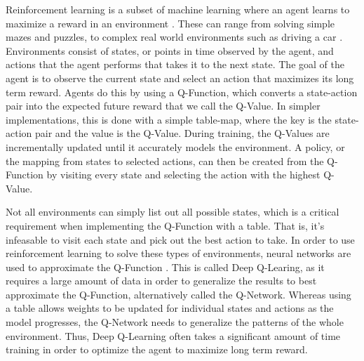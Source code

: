 \documentclass[12pt]{article}
\begin{document}
Reinforcement learning is a subset of machine learning where an agent learns to maximize a reward in an environment \cite{article_reinforcement_learning_survey}.
These can range from solving simple mazes and puzzles, to complex real world environments such as driving a car \cite{article_deep_learning_hybrid_quantum}.
Environments consist of states, or points in time observed by the agent, and actions that the agent performs that takes it to the next state.
The goal of the agent is to observe the current state and select an action that maximizes its long term reward.
Agents do this by using a Q-Function, which converts a state-action pair into the expected future reward that we call the Q-Value.
In simpler implementations, this is done with a simple table-map, where the key is the state-action pair and the value is the Q-Value.
During training, the Q-Values are incrementally updated until it accurately models the environment.
A policy, or the mapping from states to selected actions, can then be created from the Q-Function by visiting every state and selecting the action with the highest Q-Value.

Not all environments can simply list out all possible states, which is a critical requirement when implementing the Q-Function with a table.
That is, it's infeasable to visit each state and pick out the best action to take.
In order to use reinforcement learning to solve these types of environments, neural networks are used to approximate the Q-Function \cite{article_reinforcement_learning_for_robots}.
This is called Deep Q-Learing, as it requires a large amount of data in order to generalize the results to best approximate the Q-Function, alternatively called the Q-Network.
Whereas using a table allows weights to be updated for individual states and actions as the model progresses, the Q-Network needs to generalize the patterns of the whole environment.
Thus, Deep Q-Learning often takes a significant amount of time training in order to optimize the agent to maximize long term reward.
\end{document}
